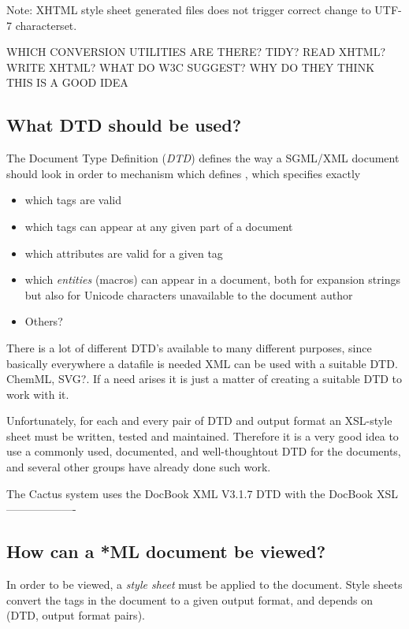 \textsf{Note: XHTML style sheet generated files does not trigger
  correct change to UTF-7 characterset.}

\textsf{WHICH CONVERSION UTILITIES ARE THERE?  TIDY?  READ XHTML?
  WRITE XHTML?  WHAT DO W3C SUGGEST?  WHY DO THEY THINK THIS IS A GOOD
  IDEA}

\subsection{What DTD should be used?}

The \textsf{Document Type Definition} (\emph{DTD}) defines the way a
SGML/XML document should look in order to mechanism
which defines , which specifies
exactly

\begin{itemize}
\item which tags are valid
\item which tags can appear at any given part of a document
\item which attributes are valid for a given tag
\item which \emph{entities} (macros) can appear in a document, both
  for expansion strings but also for Unicode characters unavailable to
  the document author
  
\item \textsf{Others?}
\end{itemize}

There is a lot of different DTD's available to many different
purposes, since basically everywhere a datafile is needed XML can be
used with a suitable DTD.   \textsf{ChemML}, \textsf{SVG?}.  If a need
arises it is just a matter of creating a suitable DTD to work with it.

Unfortunately, for each and every pair of DTD and output format an
XSL-style sheet must be written, tested and maintained.  Therefore it
is a very good idea to use a commonly used, documented, and
well-thoughtout DTD for the documents, and several other groups have
already done such work. 


The Cactus system uses the DocBook XML V3.1.7 DTD with the
DocBook XSL \textsf{-------------------}

\subsection{How can a *ML document be viewed?}

In order to be viewed, a \textit{style sheet} must be applied to the
document.  Style sheets convert the tags in the document to a given
output format, and depends on (DTD, output format pairs).


